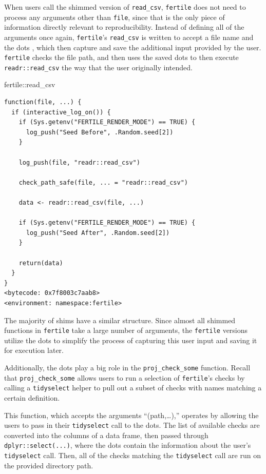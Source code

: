 \documentclass[12pt,twoside]{reedthesis}
\newenvironment{Shaded}{\begin{snugshade}}{\end{snugshade}}
\newcommand{\NormalTok}[1]{#1}
\newcommand{\SpecialCharTok}[1]{\textcolor[rgb]{0.00,0.00,0.00}{#1}}
\begin{document}
When users call the shimmed version of \texttt{read\_csv}, \texttt{fertile} does not need to process any arguments other than \texttt{file}, since that is the only piece of information directly relevant to reproducibility. Instead of defining all of the arguments once again, \texttt{fertile}'s \texttt{read\_csv} is written to accept a file name and the dots , which then capture and save the additional input provided by the user. \texttt{fertile} checks the file path, and then uses the saved dots to then execute \texttt{readr::read\_csv} the way that the user originally intended.
\begin{Shaded}
\begin{Highlighting}[]
\NormalTok{fertile}\SpecialCharTok{::}\NormalTok{read\_csv}
\end{Highlighting}
\end{Shaded}
\begin{verbatim}
function(file, ...) {
  if (interactive_log_on()) {
    if (Sys.getenv("FERTILE_RENDER_MODE") == TRUE) {
      log_push("Seed Before", .Random.seed[2])
    }

    log_push(file, "readr::read_csv")

    check_path_safe(file, ... = "readr::read_csv")

    data <- readr::read_csv(file, ...)

    if (Sys.getenv("FERTILE_RENDER_MODE") == TRUE) {
      log_push("Seed After", .Random.seed[2])
    }

    return(data)
  }
}
<bytecode: 0x7f8003c7aab8>
<environment: namespace:fertile>
\end{verbatim}
The majority of shims have a similar structure. Since almost all shimmed functions in \texttt{fertile} take a large number of arguments, the \texttt{fertile} versions utilize the dots to simplify the process of capturing this user input and saving it for execution later.

Additionally, the dots play a big role in the \texttt{proj\_check\_some} function. Recall that \texttt{proj\_check\_some} allows users to run a selection of \texttt{fertile}'s checks by calling a \texttt{tidyselect} helper to pull out a subset of checks with names matching a certain definition.

This function, which accepts the arguments ``(path,\ldots),'' operates by allowing the users to pass in their \texttt{tidyselect} call to the dots. The list of available checks are converted into the columns of a data frame, then passed through \texttt{dplyr::select(...)}, where the dots contain the information about the user's \texttt{tidyselect} call. Then, all of the checks matching the \texttt{tidyselect} call are run on the provided directory path.
\end{document}
